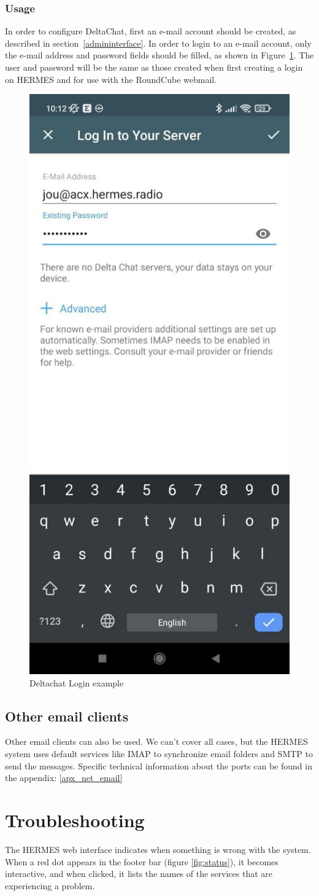 \documentclass[11pt,a4paper]{article}
\begin{document}
\subsubsection{Usage}

In order to configure DeltaChat, first an e-mail account should be created, as described in section~\ref{admininterface}. In order to login to an e-mail account, only the e-mail address and password fields should be filled, as shown in Figure~\ref{fig:deltachat-login}. The user and password will be the same as those created when first creating a login on HERMES and for use with the RoundCube webmail.

\begin{figure}[H]
    \centering
    \includegraphics[width=0.3\columnwidth]{screenshots/deltachat/en/login.jpg}
    	\caption{Deltachat Login example}
	\vspace{-10pt}
    \label{fig:deltachat-login}
\end{figure}

\subsection{Other email clients}
Other email clients can also be used. We can't cover all cases, but the HERMES system uses default services like IMAP to synchronize email folders and SMTP to send the messages. Specific technical information about the ports can be found in the appendix: \ref{apx_net_email}

\section{Troubleshooting}
The HERMES web interface indicates when something is wrong with the system. When a red dot appears in the footer bar (figure \ref{fig:status}), it becomes interactive, and when clicked, it lists the names of the services that are experiencing a problem.
\end{document}
